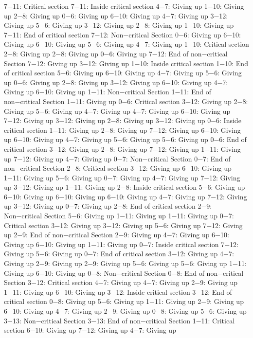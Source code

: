 7−11: Critical section
7−11: Inside critical section
4−7: Giving up
1−10: Giving up
2−8: Giving up
0−6: Giving up
6−10: Giving up
4−7: Giving up
3−12: Giving up
5−6: Giving up
3−12: Giving up
2−8: Giving up
1−10: Giving up
7−11: End of critical section
7−12: Non−critical Section
0−6: Giving up
6−10: Giving up
6−10: Giving up
5−6: Giving up
4−7: Giving up
1−10: Critical section
2−8: Giving up
2−8: Giving up
0−6: Giving up
7−12: End of non−critical Section
7−12: Giving up
3−12: Giving up
1−10: Inside critical section
1−10: End of critical section
5−6: Giving up
6−10: Giving up
4−7: Giving up
5−6: Giving up
0−6: Giving up
2−8: Giving up
3−12: Giving up
6−10: Giving up
4−7: Giving up
6−10: Giving up
1−11: Non−critical Section
1−11: End of non−critical Section
1−11: Giving up
0−6: Critical section
3−12: Giving up
2−8: Giving up
5−6: Giving up
4−7: Giving up
4−7: Giving up
6−10: Giving up
7−12: Giving up
3−12: Giving up
2−8: Giving up
3−12: Giving up
0−6: Inside critical section
1−11: Giving up
2−8: Giving up
7−12: Giving up
6−10: Giving up
6−10: Giving up
4−7: Giving up
5−6: Giving up
5−6: Giving up
0−6: End of critical section
3−12: Giving up
2−8: Giving up
7−12: Giving up
1−11: Giving up
7−12: Giving up
4−7: Giving up
0−7: Non−critical Section
0−7: End of non−critical Section
2−8: Critical section
3−12: Giving up
6−10: Giving up
1−11: Giving up
5−6: Giving up
0−7: Giving up
4−7: Giving up
7−12: Giving up
3−12: Giving up
1−11: Giving up
2−8: Inside critical section
5−6: Giving up
6−10: Giving up
6−10: Giving up
6−10: Giving up
4−7: Giving up
7−12: Giving up
3−12: Giving up
0−7: Giving up
2−8: End of critical section
2−9: Non−critical Section
5−6: Giving up
1−11: Giving up
1−11: Giving up
0−7: Critical section
3−12: Giving up
3−12: Giving up
5−6: Giving up
7−12: Giving up
2−9: End of non−critical Section
2−9: Giving up
4−7: Giving up
6−10: Giving up
6−10: Giving up
1−11: Giving up
0−7: Inside critical section
7−12: Giving up
5−6: Giving up
0−7: End of critical section
3−12: Giving up
4−7: Giving up
2−9: Giving up
2−9: Giving up
5−6: Giving up
5−6: Giving up
1−11: Giving up
6−10: Giving up
0−8: Non−critical Section
0−8: End of non−critical Section
3−12: Critical section
4−7: Giving up
4−7: Giving up
2−9: Giving up
1−11: Giving up
6−10: Giving up
3−12: Inside critical section
3−12: End of critical section
0−8: Giving up
5−6: Giving up
1−11: Giving up
2−9: Giving up
6−10: Giving up
4−7: Giving up
2−9: Giving up
0−8: Giving up
5−6: Giving up
3−13: Non−critical Section
3−13: End of non−critical Section
1−11: Critical section
6−10: Giving up
7−12: Giving up
4−7: Giving up
